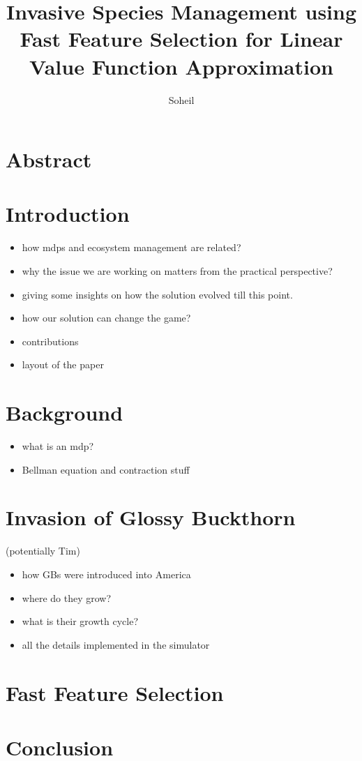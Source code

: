 \documentclass{article}
\title{Invasive Species Management using Fast Feature Selection for Linear Value Function Approximation}
\author{Soheil}
\date{}
\theoremstyle{remark}
\theoremstyle{remark}
\theoremstyle{remark}
\theoremstyle{remark}
\theoremstyle{remark}
\theoremstyle{remark}
\begin{document}
\maketitle
\section{Abstract}
\section{Introduction}
\begin{itemize}
  \item how mdps and ecosystem management are related?
  \item why the issue we are working on matters from the practical perspective?
  \item giving some insights on how the solution evolved till this point.
  \item how our solution can change the game?
  \item contributions
  \item layout of the paper
\end{itemize}

\section{Background}
\begin{itemize}
  \item what is an mdp?
  \item Bellman equation and contraction stuff

\end{itemize}

\section{Invasion of Glossy Buckthorn}
(potentially Tim)
\begin{itemize}
  \item how GBs were introduced into America
  \item where do they grow?
  \item what is their growth cycle?
  \item all the details implemented in the simulator

\end{itemize}

\section{Fast Feature Selection}

\section{Conclusion}





\end{document}
